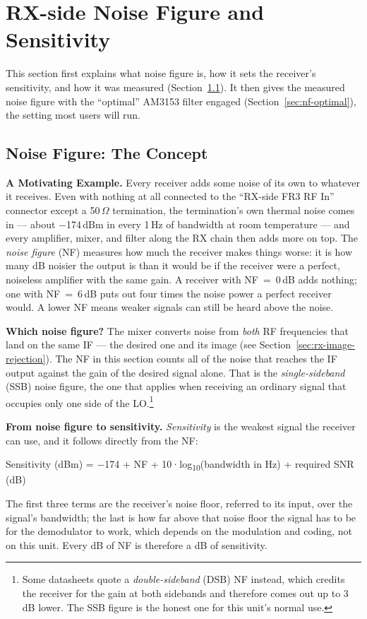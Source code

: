 \clearpage
\section{RX-side Noise Figure and Sensitivity}
\label{sec:rx-noise-figure}
\raggedbottom%


This section first explains what noise figure is, how it sets the receiver's sensitivity, and how it was measured
(Section~\ref{sec:nf-concept}). It then gives the measured noise figure with the ``optimal'' AM3153 filter engaged
(Section~\ref{sec:nf-optimal}), the setting most users will run.

\subsection{Noise Figure: The Concept}
\label{sec:nf-concept}

\textbf{A Motivating Example.} Every receiver adds some noise of its own to whatever it receives. Even with
nothing at all connected to the ``RX-side FR3 RF In'' connector except a 50\,$\Omega$ termination, the termination's
own thermal noise comes in --- about −174\,dBm in every 1\,Hz of bandwidth at room temperature --- and every amplifier, mixer, and filter along the RX chain then adds more on top. The \emph{noise figure} (NF) measures how
much the receiver makes things worse: it is how many dB noisier the output is than it would be if the
receiver were a perfect, noiseless amplifier with the same gain. A receiver with NF~=~0\,dB adds nothing; one
with NF~=~6\,dB puts out four times the noise power a perfect receiver would. A lower NF means weaker signals
can still be heard above the noise.

\textbf{Which noise figure?} The mixer converts noise from \emph{both} RF frequencies that land on the same IF ---
the desired one and its image (see Section~\ref{sec:rx-image-rejection}). The NF in this section counts all of the
noise that reaches the IF output against the gain of the desired signal alone. That is the \emph{single-sideband}
(SSB) noise figure, the one that applies when receiving an ordinary signal that occupies only one side of the
LO.\footnote{Some datasheets quote a \emph{double-sideband} (DSB) NF instead, which credits the receiver for the
gain at both sidebands and therefore comes out up to 3\,dB lower. The SSB figure is the honest one for this unit's
normal use.}

\textbf{From noise figure to sensitivity.} \emph{Sensitivity} is the weakest signal the receiver can use,
and it follows directly from the NF:
\begin{center}
Sensitivity (dBm) = −174 + NF + 10·log\textsubscript{10}(bandwidth in Hz) + required SNR (dB)
\end{center}
The first three terms are the receiver's noise floor, referred to its input, over the signal's bandwidth;
the last is how far above that noise floor the signal has to be for the demodulator to work, which depends on
the modulation and coding, not on this unit. Every dB of NF is therefore a dB of sensitivity.

